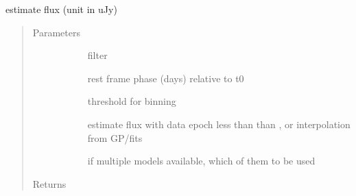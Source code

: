 \documentclass[letterpaper,10pt,english]{sphinxmanual}
\begin{document}
\begin{fulllineitems}
\label{\detokenize{generated/sdapy.snerun.snobject._flux_at:sdapy.snerun.snobject._flux_at}}
estimate flux (unit in uJy)
\begin{quote}\begin{description}
\item[{Parameters}] \leavevmode\begin{description}
\item[{}] \leavevmode{[}\sphinxtitleref{str}{]}
filter

\item[{}] \leavevmode{[}\sphinxtitleref{float}{]}
rest frame phase (days) relative to t0

\item[{}] \leavevmode{[}\sphinxtitleref{float}{]}
threshold for binning

\item[{}] \leavevmode{[}\sphinxtitleref{str}{]}
estimate flux with data epoch less than than , or interpolation from GP/fits

\item[{}] \leavevmode{[}\sphinxtitleref{int}{]}
if multiple models available, which of them to be used

\end{description}

\item[{Returns}] \leavevmode\begin{description}
\item[{}] \leavevmode{[}\sphinxtitleref{float}{]}
\item[{}] \leavevmode{[}\sphinxtitleref{float}{]}
\end{description}

\end{description}\end{quote}



\begin{description}
\item[{}] \leavevmode
\end{description}



\end{fulllineitems}
\end{document}

